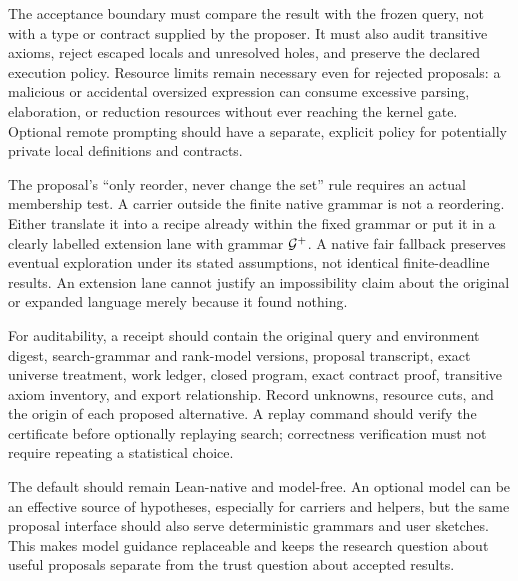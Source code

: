 The acceptance boundary must compare the result with the frozen query, not with a type or contract supplied by the proposer. It must also audit transitive axioms, reject escaped locals and unresolved holes, and preserve the declared execution policy. Resource limits remain necessary even for rejected proposals: a malicious or accidental oversized expression can consume excessive parsing, elaboration, or reduction resources without ever reaching the kernel gate. Optional remote prompting should have a separate, explicit policy for potentially private local definitions and contracts.

The proposal's ``only reorder, never change the set'' rule requires an actual membership test. A carrier outside the finite native grammar is not a reordering. Either translate it into a recipe already within the fixed grammar or put it in a clearly labelled extension lane with grammar $\mathcal G^+$. A native fair fallback preserves eventual exploration under its stated assumptions, not identical finite-deadline results. An extension lane cannot justify an impossibility claim about the original or expanded language merely because it found nothing.

For auditability, a receipt should contain the original query and environment digest, search-grammar and rank-model versions, proposal transcript, exact universe treatment, work ledger, closed program, exact contract proof, transitive axiom inventory, and export relationship. Record unknowns, resource cuts, and the origin of each proposed alternative. A replay command should verify the certificate before optionally replaying search; correctness verification must not require repeating a statistical choice.

The default should remain Lean-native and model-free. An optional model can be an effective source of hypotheses, especially for carriers and helpers, but the same proposal interface should also serve deterministic grammars and user sketches. This makes model guidance replaceable and keeps the research question about useful proposals separate from the trust question about accepted results.
